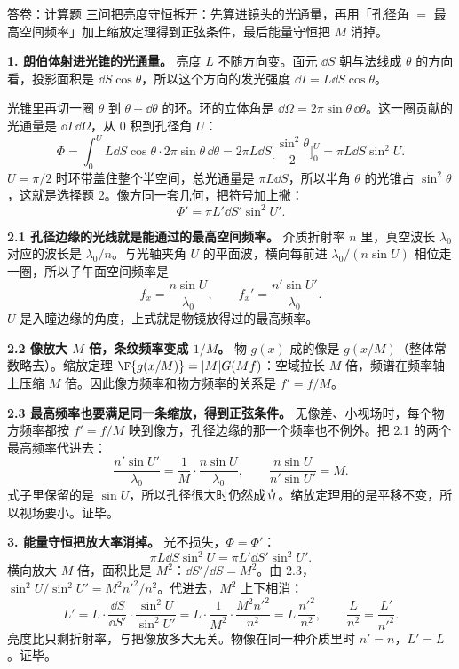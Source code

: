 \begin{exam}{答卷：计算题}
三问把亮度守恒拆开：先算进镜头的光通量，再用「孔径角 $=$ 最高空间频率」加上缩放定理得到正弦条件，最后能量守恒把 $M$ 消掉。

\textbf{1. 朗伯体射进光锥的光通量。}
亮度 $L$ 不随方向变。面元 $\dd S$ 朝与法线成 $\theta$ 的方向看，投影面积是 $\dd S\cos\theta$，所以这个方向的发光强度 $\dd I=L\dd S\cos\theta$。

光锥里再切一圈 $\theta$ 到 $\theta+\dd\theta$ 的环。环的立体角是 $\dd\Omega=2\pi\sin\theta\,\dd\theta$。这一圈贡献的光通量是 $\dd I\,\dd\Omega$，从 $0$ 积到孔径角 $U$：
\[
\Phi=\int_0^U L\dd S\cos\theta\cdot 2\pi\sin\theta\,\dd\theta
=2\pi L\dd S\Big[\frac{\sin^2\theta}{2}\Big]_0^U
=\pi L\dd S\sin^2 U .
\]
$U=\pi/2$ 时环带盖住整个半空间，总光通量是 $\pi L\dd S$，所以半角 $\theta$ 的光锥占 $\sin^2\theta$，这就是选择题 2。像方同一套几何，把符号加上撇：
\[
\boxed{\Phi'=\pi L'\dd S'\sin^2 U'} .
\]

\textbf{2.1 孔径边缘的光线就是能通过的最高空间频率。}
介质折射率 $n$ 里，真空波长 $\lambda_0$ 对应的波长是 $\lambda_0/n$。与光轴夹角 $U$ 的平面波，横向每前进 $\lambda_0/(n\sin U)$ 相位走一圈，所以子午面空间频率是
\[
f_x=\frac{n\sin U}{\lambda_0},\qquad f_x'=\frac{n'\sin U'}{\lambda_0}.
\]
$U$ 是入瞳边缘的角度，上式就是物镜放得过的最高频率。

\textbf{2.2 像放大 $M$ 倍，条纹频率变成 $1/M$。}
物 $g(x)$ 成的像是 $g(x/M)$（整体常数略去）。缩放定理 $\F\{g(x/M)\}=|M|G(Mf)$：空域拉长 $M$ 倍，频谱在频率轴上压缩 $M$ 倍。因此像方频率和物方频率的关系是 $f'=f/M$。

\textbf{2.3 最高频率也要满足同一条缩放，得到正弦条件。}
无像差、小视场时，每个物方频率都按 $f'=f/M$ 映到像方，孔径边缘的那一个频率也不例外。把 2.1 的两个最高频率代进去：
\[
\frac{n'\sin U'}{\lambda_0}=\frac1M\cdot\frac{n\sin U}{\lambda_0},
\qquad\boxed{\frac{n\sin U}{n'\sin U'}=M} .
\]
式子里保留的是 $\sin U$，所以孔径很大时仍然成立。缩放定理用的是平移不变，所以视场要小。证毕。

\textbf{3. 能量守恒把放大率消掉。}
光不损失，$\Phi=\Phi'$：
\[
\pi L\dd S\sin^2 U=\pi L'\dd S'\sin^2 U' .
\]
横向放大 $M$ 倍，面积比是 $M^2$：$\dd S'/\dd S=M^2$。由 2.3，$\sin^2 U/\sin^2 U'=M^2 n'^2/n^2$。代进去，$M^2$ 上下相消：
\[
L'=L\cdot\frac{\dd S}{\dd S'}\cdot\frac{\sin^2 U}{\sin^2 U'}
=L\cdot\frac{1}{M^2}\cdot\frac{M^2 n'^2}{n^2}
=L\,\frac{n'^2}{n^2},
\qquad\boxed{\frac{L}{n^2}=\frac{L'}{n'^2}} .
\]
亮度比只剩折射率，与把像放多大无关。物像在同一种介质里时 $n'=n$，$L'=L$。证毕。
\end{exam}

